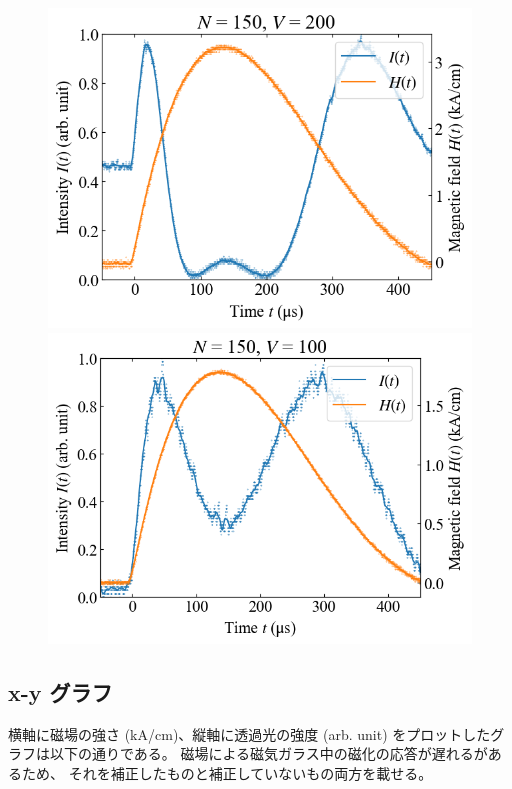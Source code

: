 \documentclass[9pt,dvipdfmx,a4paper]{jsarticle}
\begin{document}
\begin{figure}[H]
\begin{minipage}[t]{0.24\columnwidth}
        \centering
        \includegraphics[width = \columnwidth]{xt/24.png}
    \end{minipage}
    \hfill
    \begin{minipage}[t]{0.24\columnwidth}
        \centering
        \includegraphics[width = \columnwidth]{xt/25.png}
    \end{minipage}
\end{figure}

\subsection*{x-y グラフ}

横軸に磁場の強さ (kA/cm)、縦軸に透過光の強度 (arb. unit) をプロットしたグラフは以下の通りである。
磁場による磁気ガラス中の磁化の応答が遅れるがあるため、
それを補正したものと補正していないもの両方を載せる。
\end{document}
